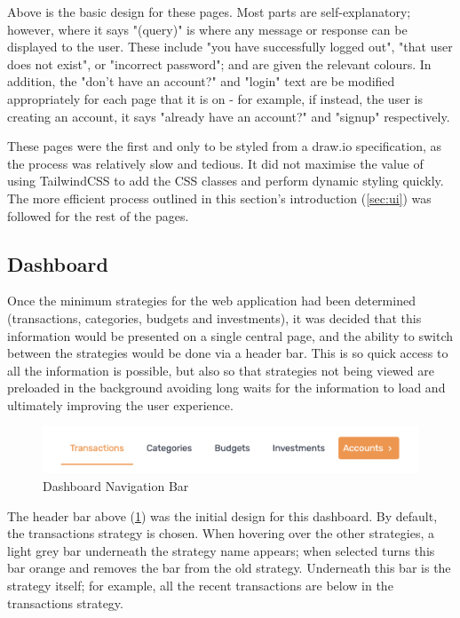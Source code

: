Above is the basic design for these pages. Most parts are self-explanatory; however, where it says "(query)" is where any message or response can be displayed to the user. These include "you have successfully logged out", "that user does not exist", or "incorrect password"; and are given the relevant colours. In addition, the "don't have an account?" and "login" text are be modified appropriately for each page that it is on - for example, if instead, the user is creating an account, it says "already have an account?" and "signup" respectively.

These pages were the first and only to be styled from a draw.io specification, as the process was relatively slow and tedious. It did not maximise the value of using TailwindCSS to add the CSS classes and perform dynamic styling quickly. The more efficient process outlined in this section's introduction (\ref{sec:ui}) was followed for the rest of the pages.

\subsection{Dashboard}
Once the minimum strategies for the web application had been determined (transactions, categories, budgets and investments), it was decided that this information would be presented on a single central page, and the ability to switch between the strategies would be done via a header bar. This is so quick access to all the information is possible, but also so that strategies not being viewed are preloaded in the background avoiding long waits for the information to load and ultimately improving the user experience.

\begin{figure}[H]
	\centering
	\includegraphics[width=\textwidth]{images/header_navigation_bar.png}
	\caption{Dashboard Navigation Bar}
	\label{fig:DashboardNavigationBar}
\end{figure}

The header bar above (\ref{fig:DashboardNavigationBar}) was the initial design for this dashboard. By default, the transactions strategy is chosen. When hovering over the other strategies, a light grey bar underneath the strategy name appears; when selected turns this bar orange and removes the bar from the old strategy. Underneath this bar is the strategy itself; for example, all the recent transactions are below in the transactions strategy.


